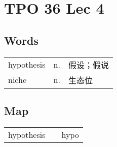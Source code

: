 \section{TPO 36 Lec 4}

\subsection{Words}

\begin{tabular}{lll}
    hypothesis & n. & 假设；假说 \\
    niche      & n. & 生态位   \\
\end{tabular}


\subsection{Map}

\begin{tabular}{rc@{\quad$\to$\quad}l}
    hypothesis &  & hypo \\
\end{tabular}